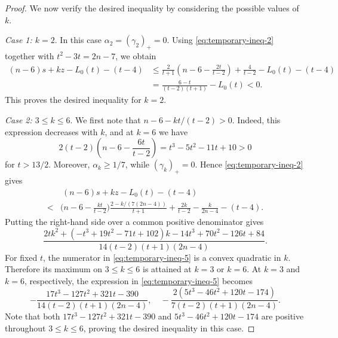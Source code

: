 \documentclass[10pt,a4paper]{amsart}
\begin{document}
\begin{proof}
We now verify the desired inequality by considering the possible values of $k$.
\smallskip

\noindent\emph{Case 1: $k=2$}. In this case $\alpha_2 = (\gamma_2)_+ = 0$. 
Using \eqref{eq:temporary-ineq-2} together with $t^2-3t=2n-7$, we obtain
\begin{align*}
(n-6)s + kz - L_0(t) - (t-4)
& \leq\frac{2}{t+1}\left(n-6-\frac{2t}{t-2}\right) + \frac{4}{t-2}
 -L_0(t)-(t-4) \\
& = \frac{6-t}{(t-2)(t+1)}-L_0(t)<0.
\end{align*}
This proves the desired inequality for $k=2$.

\smallskip
\noindent\emph{Case 2: $3\leq k\leq 6$}.
We first note that $n - 6 - kt/(t-2) > 0$. Indeed, this expression decreases with $k$, and at $k=6$ we have
\begin{equation}\label{eq:temporary-ineq-4}
2(t-2)\left(n-6-\frac{6t}{t-2}\right)
= t^3 - 5t^2 - 11t + 10 > 0
\end{equation}
for $t>13/2$. Moreover, $\alpha_k\ge1/7$, while $(\gamma_k)_+ = 0$. Hence \eqref{eq:temporary-ineq-2} gives
\begin{align*}
& ~ (n-6)s + kz - L_0(t) - (t-4) \\
< & \Big(n - 6 - \frac{kt}{t-2}\Big)
\frac{2 - k/(7(2n-4))}{t+1} + \frac{2k}{t-2} - \frac{k}{2n-4} - (t-4).
\end{align*}
Putting the right-hand side over a common positive denominator gives
\begin{equation}\label{eq:temporary-ineq-5}
\frac{2tk^2+(-t^3+19t^2-71t+102)k -14t^3+70t^2-126t+84}{14(t-2)(t+1)(2n-4)}.
\end{equation}
For fixed $t$, the numerator in \eqref{eq:temporary-ineq-5} is a convex quadratic in
$k$. Therefore its maximum on $3\leq k\leq 6$ is attained at
$k=3$ or $k=6$. At $k=3$ and $k=6$, respectively, the expression
in \eqref{eq:temporary-ineq-5} becomes
\[
-\frac{17t^3-127t^2+321t-390}{14(t-2)(t+1)(2n-4)}, \quad
-\frac{2(5t^3-46t^2+120t-174)}{7(t-2)(t+1)(2n-4)}.
\]
Note that both $17t^3-127t^2+321t-390$ and $5t^3-46t^2+120t-174$ are positive throughout
$3\leq k\leq 6$, proving the desired inequality in this case.


\end{proof}
\end{document}
